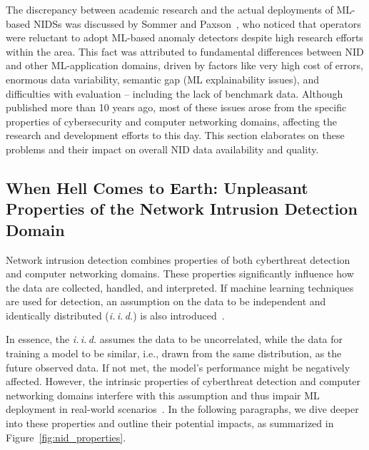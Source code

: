 The discrepancy between academic research and the actual deployments of ML-based NIDSs was discussed by Sommer and Paxson~\cite{sommer2010_sok_outside}, who noticed that operators were reluctant to adopt ML-based anomaly detectors despite high research efforts within the area. This fact was attributed to fundamental differences between NID and other ML-application domains, driven by factors like very high cost of errors, enormous data variability, semantic gap (ML explainability issues), and difficulties with evaluation -- including the lack of benchmark data. Although published more than 10 years ago, most of these issues arose from the specific properties of cybersecurity and computer networking domains, affecting the research and development efforts to this day. This section elaborates on these problems and their impact on overall NID data availability and quality.

\subsection{When Hell Comes to Earth: Unpleasant Properties of the Network Intrusion Detection Domain}
\label{ssec:domain_specs_domain_char}

Network intrusion detection combines properties of both cyberthreat detection and computer networking domains. These properties significantly influence how the data are collected, handled, and interpreted. If machine learning techniques are used for detection, an assumption on the data to be independent and identically distributed (\emph{i.\,i.\,d.}) is also introduced~\cite{dundar2007_learning_classifiers_noniid}.

In essence, the \emph{i.\,i.\,d.} assumes the data to be uncorrelated, while the data for training a model to be similar, i.e., drawn from the same distribution, as the future observed data. If not met, the model's performance might be negatively affected. However, the intrinsic properties of cyberthreat detection and computer networking domains interfere with this assumption and thus impair ML deployment in real-world scenarios~\cite{apruzzese2023_role_of_ml_cybersec}. In the following paragraphs, we dive deeper into these properties and outline their potential impacts, as summarized in Figure~\ref{fig:nid_properties}.

